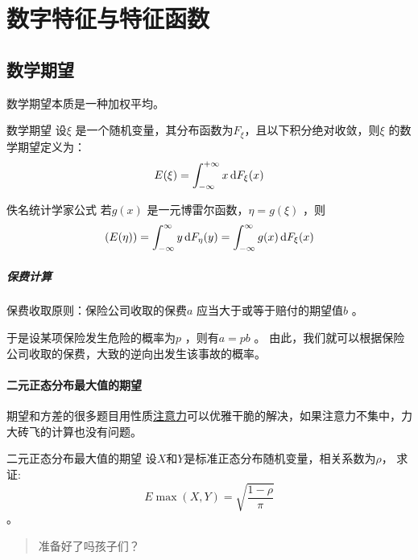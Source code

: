 \chapter{数字特征与特征函数}
\section{数学期望}
数学期望本质是一种加权平均。

\begin{definition}{数学期望}
    设\(\xi\) 是一个随机变量，其分布函数为\(F_{\xi}\)，且以下积分绝对收敛，则\(\xi\) 的数学期望定义为：
    \[
        E(\xi) = \int_{-\infty}^{+\infty} x \d{F_{\xi}}(x)
    \]
\end{definition}


\begin{theorem}{佚名统计学家公式}
    若\(g(x)\) 是一元博雷尔函数，\(\eta=g(\xi)\) ，则\[
        (E(\eta)) = \int_{-\infty}^{\infty} y \d{F_{\eta}}(y) =
        \int_{-\infty}^{\infty} g(x) \d{F_{\xi}}(x)
    \]
\end{theorem}

\paragraph{保费计算}
保费收取原则：保险公司收取的保费\(a\) 应当大于或等于赔付的期望值\(b\) 。

于是设某项保险发生危险的概率为\(p\) ，则有\(a=pb\) 。
由此，我们就可以根据保险公司收取的保费，大致的逆向出发生该事故的概率。 

\subsubsection{二元正态分布最大值的期望}
期望和方差的很多题目用性质\underline{注意力}可以优雅干脆的解决，如果注意力不集中，力大砖飞的计算也没有问题。

\begin{problem}{二元正态分布最大值的期望}
    设\(X\)和\(Y\)是标准正态分布随机变量，相关系数为\(\rho\)，
    求证:\[E\max(X,Y)= \sqrt{\frac{1-\rho}{\pi}}\]。
\end{problem}

\begin{quote}
    准备好了吗孩子们？
\end{quote}

